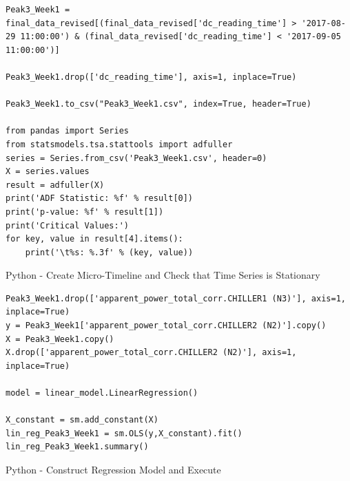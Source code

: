 \documentclass[12pt]{scrartcl}
\begin{document}
\begin{listing}[H]
\begin{verbatim}
Peak3_Week1 = final_data_revised[(final_data_revised['dc_reading_time'] > '2017-08-29 11:00:00') & (final_data_revised['dc_reading_time'] < '2017-09-05 11:00:00')]

Peak3_Week1.drop(['dc_reading_time'], axis=1, inplace=True)

Peak3_Week1.to_csv("Peak3_Week1.csv", index=True, header=True)

from pandas import Series
from statsmodels.tsa.stattools import adfuller
series = Series.from_csv('Peak3_Week1.csv', header=0)
X = series.values
result = adfuller(X)
print('ADF Statistic: %f' % result[0])
print('p-value: %f' % result[1])
print('Critical Values:')
for key, value in result[4].items():
	print('\t%s: %.3f' % (key, value))

\end{verbatim}
\caption{Python - Create Micro-Timeline and Check that Time Series is Stationary}
\label{list:[Python - Create Micro-Timeline and Check that Time Series is Stationary]}
\end{listing}

\begin{listing}[H]
\begin{verbatim}
Peak3_Week1.drop(['apparent_power_total_corr.CHILLER1 (N3)'], axis=1, inplace=True)
y = Peak3_Week1['apparent_power_total_corr.CHILLER2 (N2)'].copy() 
X = Peak3_Week1.copy()
X.drop(['apparent_power_total_corr.CHILLER2 (N2)'], axis=1, inplace=True)

model = linear_model.LinearRegression()

X_constant = sm.add_constant(X)
lin_reg_Peak3_Week1 = sm.OLS(y,X_constant).fit()
lin_reg_Peak3_Week1.summary()

\end{verbatim}
\caption{Python - Construct Regression Model and Execute}
\label{list:[Python - Construct Regression Model and Execute]}
\end{listing}
\end{document}
